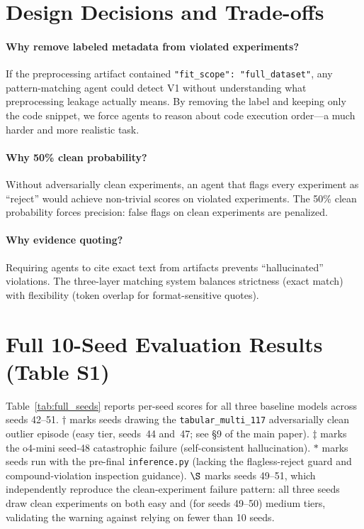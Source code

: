 \documentclass{article}
\begin{document}
\section{Design Decisions and Trade-offs}

\paragraph{Why remove labeled metadata from violated experiments?}
If the preprocessing artifact contained
\texttt{"fit\_scope": "full\_dataset"}, any pattern-matching agent could
detect V1 without understanding what preprocessing leakage actually means.
By removing the label and keeping only the code snippet, we force agents
to reason about code execution order---a much harder and more realistic
task.

\paragraph{Why 50\% clean probability?}
Without adversarially clean experiments, an agent that flags every
experiment as ``reject'' would achieve non-trivial scores on violated
experiments.  The 50\% clean probability forces precision: false flags on
clean experiments are penalized.

\paragraph{Why evidence quoting?}
Requiring agents to cite exact text from artifacts prevents
``hallucinated'' violations.  The three-layer matching system balances
strictness (exact match) with flexibility (token overlap for
format-sensitive quotes).

\section{Full 10-Seed Evaluation Results (Table S1)}
\label{sec:table-s1}

Table~\ref{tab:full_seeds} reports per-seed scores for all three baseline models
across seeds 42--51.  $\dagger$ marks seeds drawing the \texttt{tabular\_multi\_117}
adversarially clean outlier episode (easy tier, seeds~44 and~47; see \S9 of the main paper).
$\ddagger$ marks the o4-mini seed-48 catastrophic failure (self-consistent hallucination).
$*$ marks seeds run with the pre-final \texttt{inference.py} (lacking the flagless-reject
guard and compound-violation inspection guidance).
$\S$ marks seeds 49--51, which independently reproduce the clean-experiment failure pattern:
all three seeds draw clean experiments on both easy and (for seeds 49--50) medium tiers,
validating the warning against relying on fewer than 10 seeds.
\end{document}
